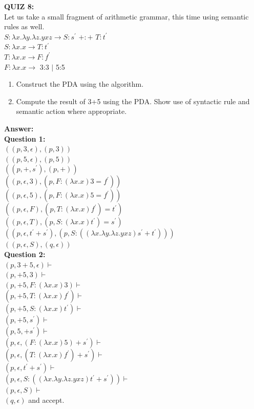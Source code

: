 \documentclass[12pt,a4paper]{article}
\begin{document}
\noindent \textbf{\Large{QUIZ 8:}}\\
Let us take a small fragment of arithmetic grammar, this time using
semantic rules as well.\\

\noindent $S:\lambda x.\lambda y.\lambda z. yxz \rightarrow S:s^{'}$ $+:+$ $T:t^{'}$\\
$S:\lambda x.x \rightarrow T:t^{'}$\\
$T:\lambda x.x \rightarrow F:f^{'}$\\
$F:\lambda x.x \rightarrow$ 3:3 $|$ 5:5\\

\begin{enumerate}
\item Construct the PDA using the algorithm.
\item Compute the result of 3+5 using the PDA. Show use of syntactic rule and semantic action where appropriate.
\end{enumerate}

\noindent \textbf{\Large{Answer:}}\\
\textbf{Question 1:}\\
$((p,3,\epsilon),(p,3))$\\
$((p,5,\epsilon),(p,5))$\\
$((p,+,s^{'}),(p,+))$\\
$((p,\epsilon,3),(p,F:(\lambda x.x)3=f^{'}))$\\
$((p,\epsilon,5),(p,F:(\lambda x.x)5=f^{'}))$\\
$((p,\epsilon,F),(p,T:(\lambda x.x)f^{'})=t^{'})$\\
$((p,\epsilon,T),(p,S:(\lambda x.x)t^{'})=s^{'})$\\
$((p,\epsilon,t^{'}+s^{'}),(p,S:((\lambda x.\lambda y.\lambda z. yxz)s^{'}+t^{'})))$\\
$((p,\epsilon,S),(q,\epsilon))$\\

\noindent \textbf{Question 2:}\\
$(p,3+5,\epsilon)\vdash$\\
$(p,+5,3)\vdash$\\
$(p,+5,F:(\lambda x.x)3)\vdash$\\
$(p,+5,T:(\lambda x.x)f^{'})\vdash$\\
$(p,+5,S:(\lambda x.x)t^{'})\vdash$\\
$(p,+5,s^{'})\vdash$\\
$(p,5,+s^{'})\vdash$\\
$(p,\epsilon, (F:(\lambda x.x)5)+s^{'})\vdash$\\
$(p,\epsilon, (T:(\lambda x.x)f^{'})+s^{'})\vdash$\\
$(p,\epsilon,t^{'}+s^{'})\vdash$\\
$(p,\epsilon,S:((\lambda x.\lambda y.\lambda z. yxz)t^{'}+s^{'}))\vdash$\\
$(p,\epsilon,S)\vdash$\\
$(q,\epsilon)$ and accept.
\end{document}
